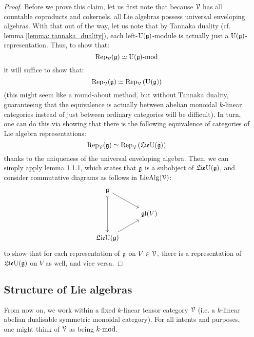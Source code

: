             \begin{proof}
                Before we prove this claim, let us first note that because $\calV$ has all countable coproducts and cokernels, all Lie algebras possess universal enveloping algebras. With that out of the way, let us note that by Tannaka duality (cf. lemma \ref{lemma: tannaka_duality}), each left-$\U(\g)$-module is actually just a $\U(\g)$-representation. Thus, to show that:
                    $$\Rep_{\calV}(\g) \cong {\U(\g)}\mod$$
                it will suffice to show that:
                    $$\Rep_{\calV}(\g) \cong \Rep_{\calV}\left(\U(\g)\right)$$
                (this might seem like a round-about method, but without Tannaka duality, guaranteeing that the equivalence is actually between abelian monoidal $k$-linear categories instead of just between ordinary categories will be difficult). In turn, one can do this via showing that there is the following equivalence of categories of Lie algebra representations:
                    $$\Rep_{\calV}(\g) \cong \Rep_{\calV}\left(\frakLie \U(\g)\right)$$
                thanks to the uniqueness of the universal enveloping algebra. Then, we can simply apply lemma 1.1.1, which states that $\g$ is a subobject of $\frakLie \U(\g)$, and consider commutative diagrams as follows in $\Lie\Alg(\calV)$:
                    $$
                        \begin{tikzcd}
                        	{\g} \\
                        	& {\gl(V)} \\
                        	{\frakLie \U(\g)}
                        	\arrow[from=1-1, to=2-2]
                        	\arrow[from=3-1, to=2-2]
                        	\arrow[from=1-1, to=3-1, tail]
                        \end{tikzcd}
                    $$
                to show that for each representation of $\g$ on $V \in \calV$, there is a representation of $\frakLie \U(\g)$ on $V$ as well, and vice versa.
            \end{proof}
            
    \subsection{Structure of Lie algebras}
        \begin{convention}
            From now on, we work within a fixed $k$-linear tensor category $\calV$ (i.e. a $k$-linear abelian dualisable symmetric monoidal category). For all intents and purposes, one might think of $\calV$ as being $k\mod$.
        \end{convention}
        
